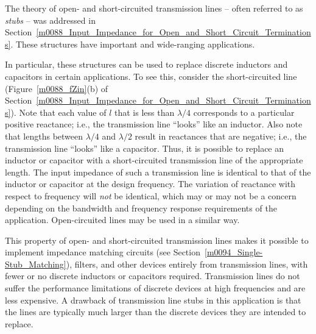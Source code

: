 

\label{m0145_Applications_of_Open_and_Short-Circuited_Transmission_Lines} %

The theory of open- and short-circuited transmission lines -- often referred to as \emph{stubs} -- was addressed in Section~\ref{m0088_Input_Impedance_for_Open_and_Short_Circuit_Terminations}. 
These structures have important and wide-ranging applications. 

In particular, these structures can be used to replace discrete inductors and capacitors in certain applications.  
To see this, consider the short-circuited line (Figure~\ref{m0088_fZin}(b) of Section~\ref{m0088_Input_Impedance_for_Open_and_Short_Circuit_Terminations}). Note that each value of $l$ that is less than $\lambda/4$ corresponds to a particular positive reactance; i.e., the transmission line ``looks'' like an inductor.
Also note that lengths between $\lambda/4$ and $\lambda/2$ result in reactances that are negative; i.e., the transmission line ``looks'' like a capacitor.
Thus, it is possible to replace an inductor or capacitor with a short-circuited transmission line of the appropriate length.
The input impedance of such a transmission line is identical to that of the inductor or capacitor at the design frequency. 
The variation of reactance with respect to frequency will \emph{not} be identical, which may or may not be a concern depending on the bandwidth and frequency response requirements of the application.
Open-circuited lines may be used in a similar way. 

This property of open- and short-circuited transmission lines makes it possible to implement impedance matching 
circuits (see Section~\ref{m0094_Single-Stub_Matching}), filters, 
and other devices entirely from transmission lines, with fewer or no discrete inductors or capacitors required.
Transmission lines do not suffer the performance limitations of discrete devices at high frequencies and are less expensive.
A drawback of transmission line stubs in this application is that the lines are typically much larger than the discrete devices they are intended to replace.

